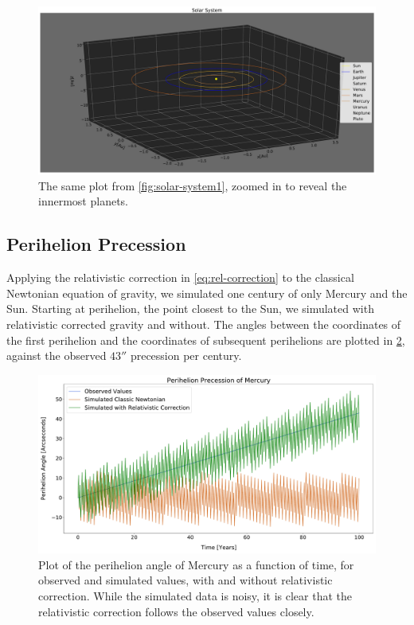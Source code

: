 \documentclass[../main.tex]{subfiles}
\begin{document}
\begin{figure}[htb!]
    \centering
    \includegraphics[trim=5.cm 0.cm 0.cm 0.cm, clip,width=\textwidth]{../figures/solar_system2.pdf}
    \caption{The same plot from \cref{fig:solar-system1}, zoomed in to reveal the innermost planets.}
    \label{fig:solar-system2}
\end{figure}

\subsection{Perihelion Precession}

Applying the relativistic correction in \cref{eq:rel-correction} to the classical Newtonian equation of gravity, we simulated one century of only Mercury and the Sun. Starting at perihelion, the point closest to the Sun, we simulated with relativistic corrected gravity and without. The angles between the coordinates of the first perihelion and the coordinates of subsequent perihelions are plotted in \cref{fig:perihelion-precession}, against the observed $43''$ precession per century.

\begin{figure}[htb!]
    \centering
    \includegraphics[width=1.0\textwidth]{../figures/3-10^7 perihelion.pdf}
    \caption{Plot of the perihelion angle of Mercury as a function of time, for observed and simulated values, with and without relativistic correction. While the simulated data is noisy, it is clear that the relativistic correction follows the observed values closely.}
    \label{fig:perihelion-precession}
\end{figure}
\end{document}
